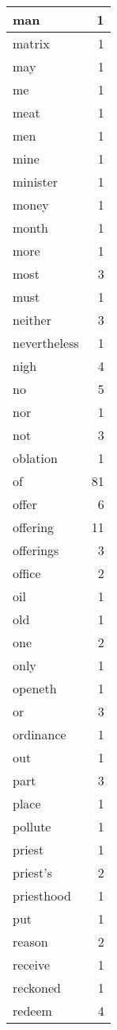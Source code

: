 \begin{center}
\begin{longtable}{l|r}
man & 1 \\ \hline
matrix & 1 \\ \hline
may & 1 \\ \hline
me & 1 \\ \hline
meat & 1 \\ \hline
men & 1 \\ \hline
mine & 1 \\ \hline
minister & 1 \\ \hline
money & 1 \\ \hline
month & 1 \\ \hline
more & 1 \\ \hline
most & 3 \\ \hline
must & 1 \\ \hline
neither & 3 \\ \hline
nevertheless & 1 \\ \hline
nigh & 4 \\ \hline
no & 5 \\ \hline
nor & 1 \\ \hline
not & 3 \\ \hline
oblation & 1 \\ \hline
of & 81 \\ \hline
offer & 6 \\ \hline
offering & 11 \\ \hline
offerings & 3 \\ \hline
office & 2 \\ \hline
oil & 1 \\ \hline
old & 1 \\ \hline
one & 2 \\ \hline
only & 1 \\ \hline
openeth & 1 \\ \hline
or & 3 \\ \hline
ordinance & 1 \\ \hline
out & 1 \\ \hline
part & 3 \\ \hline
place & 1 \\ \hline
pollute & 1 \\ \hline
priest & 1 \\ \hline
priest's & 2 \\ \hline
priesthood & 1 \\ \hline
put & 1 \\ \hline
reason & 2 \\ \hline
receive & 1 \\ \hline
reckoned & 1 \\ \hline
redeem & 4 \\ \hline

\end{longtable}
\end{center}
